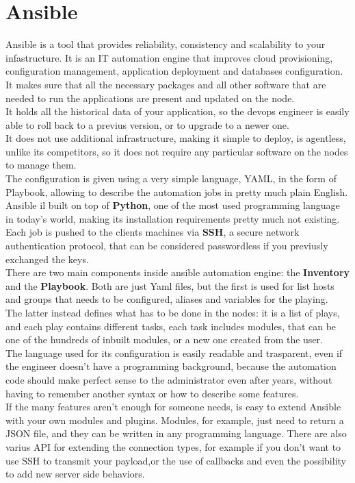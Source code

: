 \documentclass[conference]{IEEEtran}
\begin{document}
\section{Ansible} %
\label{ansible}
Ansible is a tool that provides reliability, consistency and scalability to your infastructure. It is an IT automation engine that improves cloud provisioning, configuration management, application deployment and databases configuration.\\
It makes sure that all the necessary packages and all other software that are needed to run the applications are present and updated on the node.\\
It holds all the historical data of your application, so the devops engineer is easily able to roll back to a previus version, or to upgrade to a newer one.\\
It does not use additional infrastructure, making it simple to deploy, is agentless, unlike its competitors, so it does not require any particular software on the nodes to manage them.\\
The configuration is given using a very simple language, YAML, in the form of Playbook, allowing to describe the automation jobs in pretty much plain English.\\ 
Ansible il built on top of \textbf{Python}, one of the most used programming language in today's world, making its installation requirements pretty much not existing.\\ 
Each job is pushed to the clients machines via \textbf{SSH}, a secure network authentication protocol, that can be considered passwordless if you previusly exchanged the keys. \\
There are two main components inside ansible automation engine: the \textbf{Inventory} and the \textbf{Playbook}.
Both are just Yaml files, but the first is used for list hosts and groups that needs to be configured, aliases and variables for the playing.\\
The latter instead defines what has to be done in the nodes: it is a list of plays, and each play contains different tasks, each task includes modules, that can be one of the hundreds of inbuilt modules, or a new one created from the user.\\
The language used for its configuration is easily readable and trasparent, even if the engineer doesn't have a programming background, because the automation code should make perfect sense to the administrator even after years, without having to remember another syntax or how to describe some features.\\
If the many features aren't enough for someone needs, is easy to extend Ansible with your own modules and plugins. Modules, for example, just need to return a JSON file, and they can be written in any programming language. There are also varius API for extending the connection types, for example if you don't want to use SSH to transmit your payload,or the use of callbacks and even the possibility to add new server side behaviors.\\
\end{document}
